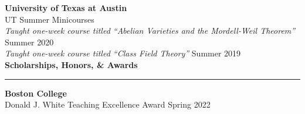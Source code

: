 \documentclass[11pt]{article}
\newenvironment{mysection}{
\color{mygreen}\bfseries\large
}
{
\\ \rule{\textwidth}{1pt}\hspace{-.25em}
} %
\begin{document}
\textbf{University of Texas at Austin} \\
UT Summer Minicourses \\
\textit{Taught one-week course titled ``Abelian Varieties and the Mordell-Weil Theorem''} \hfill Summer 2020 \\
\textit{Taught one-week course titled ``Class Field Theory''} \hfill Summer 2019 \\

\begin{mysection}Scholarships, Honors, \& Awards\end{mysection}
\textbf{Boston College} \\
Donald J. White Teaching Excellence Award \hfill Spring 2022 \\

\end{document}
